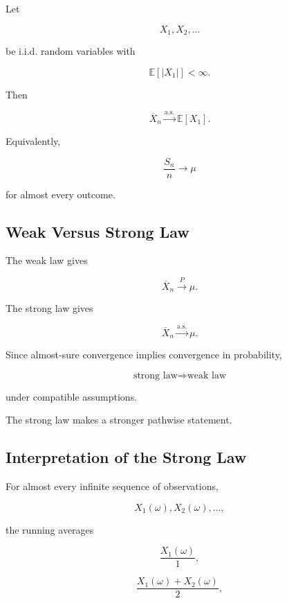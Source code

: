 \begin{theorem}
Let

\[
X_1,X_2,\ldots
\]

be i.i.d. random variables with

\[
\mathbb{E}[|X_1|]<\infty.
\]

Then

\[
\boxed{
\overline{X}_n
\xrightarrow{\text{a.s.}}
\mathbb{E}[X_1].
}
\]
\end{theorem}

Equivalently,

\[
\boxed{
\frac{S_n}{n}
\to
\mu
}
\]

for almost every outcome.

\subsection{Weak Versus Strong Law}
\label{subsec:weak-versus-strong-law}

The weak law gives

\[
\boxed{
\overline{X}_n
\xrightarrow{P}
\mu.
}
\]

The strong law gives

\[
\boxed{
\overline{X}_n
\xrightarrow{\text{a.s.}}
\mu.
}
\]

Since almost-sure convergence implies convergence in probability,

\[
\boxed{
\text{strong law}
\Longrightarrow
\text{weak law}
}
\]

under compatible assumptions.

The strong law makes a stronger pathwise statement.

\subsection{Interpretation of the Strong Law}
\label{subsec:strong-law-interpretation}

For almost every infinite sequence of observations,

\[
X_1(\omega),
X_2(\omega),
\ldots,
\]

the running averages

\[
\frac{X_1(\omega)}1,
\]

\[
\frac{X_1(\omega)+X_2(\omega)}2,
\]

